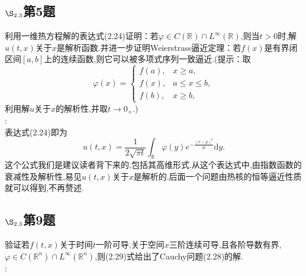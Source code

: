 \documentclass[12pt, a4paper]{ctexbook}
\newcommand{\dy}{\text{d}y}
\begin{document}
    
    \subsection{$\S_{2.3}$第5题}
    \kaishu{}利用一维热方程解的表达式(2.24)证明：若$\varphi \in C(\mathbb{R}) \cap L^{\infty}(\mathbb{R})$,则当$t>0$时,解$u(t,x)$关于$x$是解析函数.并进一步证明Weierstrass逼近定理：若$f(x)$是有界闭区间$[a,b]$上的连续函数,则它可以被多项式序列一致逼近.(提示：取
    \begin{equation*}
    \varphi(x) =
    \begin{cases}
    f(a),&x\ge a ,\\
    f(x), &a\le x \le b,\\
    f(b), &x \ge b,
    \end{cases}
    \end{equation*}
    利用解$u$关于$x$的解析性,并取$t \to 0_{+}$.) \\
    
    \songti{}:\\
    
    表达式(2.24)即为
    \begin{equation*}
    u(t,x) = \frac{1}{2\sqrt{\pi t}} \int_{\mathbb{R}} \varphi(y) e^{-\frac{(x-y)^2}{4t}}\dy.
    \end{equation*}
    这个公式我们是建议读者背下来的,包括其高维形式.从这个表达式中,由指数函数的衰减性及解析性,易见$u(t,x)$关于$x$是解析的.后面一个问题由热核的恒等逼近性质就可以得到,不再赘述.
    
    
    \subsection{$\S_{2.3}$第9题}
    \kaishu{}验证若$f(t,x)$关于时间$t$一阶可导,关于空间$x$三阶连续可导,且各阶导数有界,$\varphi \in C(\mathbb{R}^n) \cap L^{\infty}(\mathbb{R}^n)$,则(2.29)式给出了Cauchy问题(2.28)的解. \\
    
    \songti{}:\\
    
\end{document}
